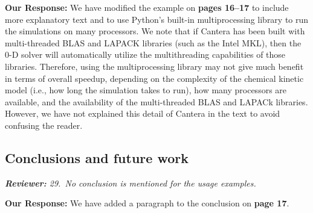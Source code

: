 \documentclass[a4paper,10pt]{elsarticle}
\newenvironment{reviewer}{\vspace{0.5\baselineskip}\begingroup\itshape\textbf{Reviewer:}}{\endgroup}
\newenvironment{response}{\textbf{Our Response:}}{\vspace{0.5\baselineskip}}
\begin{document}
\begin{response}
    We have modified the example on \textbf{pages 16--17} to include more
    explanatory text and to use Python's built-in
    multiprocessing library to run the simulations on many processors. We note that if Cantera has
    been built with multi-threaded BLAS and LAPACK libraries (such as the Intel MKL), then the 0-D
    solver will automatically utilize the multithreading capabilities of those libraries. Therefore,
    using the multiprocessing library may not give much benefit in terms of overall speedup,
    depending on the complexity of the chemical kinetic model (i.e., how long the simulation
    takes to run), how many processors are available, and the availability of the multi-threaded
    BLAS and LAPACk libraries. However, we have not explained this detail of Cantera in the text to
    avoid confusing the reader.
\end{response}

\subsection*{Conclusions and future work}

\begin{reviewer}
    29.~No conclusion is mentioned for the usage examples.
\end{reviewer}

\begin{response}
    We have added a paragraph to the conclusion on \textbf{page 17}.
\end{response}
\end{document}
